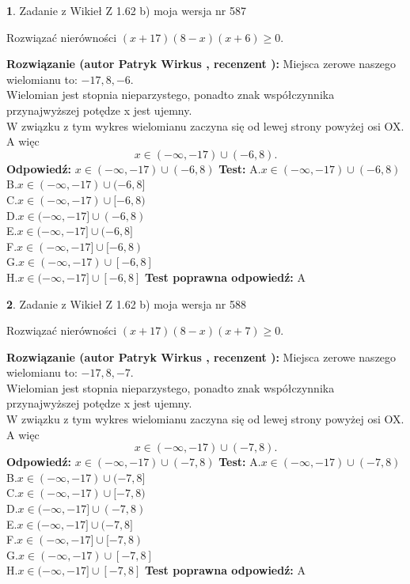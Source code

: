 \documentclass[12pt, a4paper]{article}
\theoremstyle{definition} %
\newtheorem{zad}{}
\newcommand{\zadStart}[1]{\begin{zad}#1\newline}
\newcommand{\zadStop}{\end{zad}}
\newcommand{\rozwStart}[2]{\noindent \textbf{Rozwiązanie (autor #1 , recenzent #2): }\newline}
\newcommand{\rozwStop}{\newline}
\newcommand{\odpStart}{\noindent \textbf{Odpowiedź:}\newline}
\newcommand{\odpStop}{\newline}
\newcommand{\testStart}{\noindent \textbf{Test:}\newline}
\newcommand{\testStop}{\newline}
\newcommand{\kluczStart}{\noindent \textbf{Test poprawna odpowiedź:}\newline}
\newcommand{\kluczStop}{\newline}
\begin{document}
\zadStart{Zadanie z Wikieł Z 1.62 b) moja wersja nr 587}

Rozwiązać nierówności $(x+17)(8-x)(x+6)\ge0$.
\zadStop
\rozwStart{Patryk Wirkus}{}
Miejsca zerowe naszego wielomianu to: $-17, 8, -6$.\\
Wielomian jest stopnia nieparzystego, ponadto znak współczynnika przy\linebreak najwyższej potędze x jest ujemny.\\ W związku z tym wykres wielomianu zaczyna się od lewej strony powyżej osi OX. A więc $$x \in (-\infty,-17) \cup (-6,8).$$
\rozwStop
\odpStart
$x \in (-\infty,-17) \cup (-6,8)$
\odpStop
\testStart
A.$x \in (-\infty,-17) \cup (-6,8)$\\
B.$x \in (-\infty,-17) \cup (-6,8]$\\
C.$x \in (-\infty,-17) \cup [-6,8)$\\
D.$x \in (-\infty,-17] \cup (-6,8)$\\
E.$x \in (-\infty,-17] \cup (-6,8]$\\
F.$x \in (-\infty,-17] \cup [-6,8)$\\
G.$x \in (-\infty,-17) \cup [-6,8]$\\
H.$x \in (-\infty,-17] \cup [-6,8]$
\testStop
\kluczStart
A
\kluczStop



\zadStart{Zadanie z Wikieł Z 1.62 b) moja wersja nr 588}

Rozwiązać nierówności $(x+17)(8-x)(x+7)\ge0$.
\zadStop
\rozwStart{Patryk Wirkus}{}
Miejsca zerowe naszego wielomianu to: $-17, 8, -7$.\\
Wielomian jest stopnia nieparzystego, ponadto znak współczynnika przy\linebreak najwyższej potędze x jest ujemny.\\ W związku z tym wykres wielomianu zaczyna się od lewej strony powyżej osi OX. A więc $$x \in (-\infty,-17) \cup (-7,8).$$
\rozwStop
\odpStart
$x \in (-\infty,-17) \cup (-7,8)$
\odpStop
\testStart
A.$x \in (-\infty,-17) \cup (-7,8)$\\
B.$x \in (-\infty,-17) \cup (-7,8]$\\
C.$x \in (-\infty,-17) \cup [-7,8)$\\
D.$x \in (-\infty,-17] \cup (-7,8)$\\
E.$x \in (-\infty,-17] \cup (-7,8]$\\
F.$x \in (-\infty,-17] \cup [-7,8)$\\
G.$x \in (-\infty,-17) \cup [-7,8]$\\
H.$x \in (-\infty,-17] \cup [-7,8]$
\testStop
\kluczStart
A
\kluczStop
\end{document}
